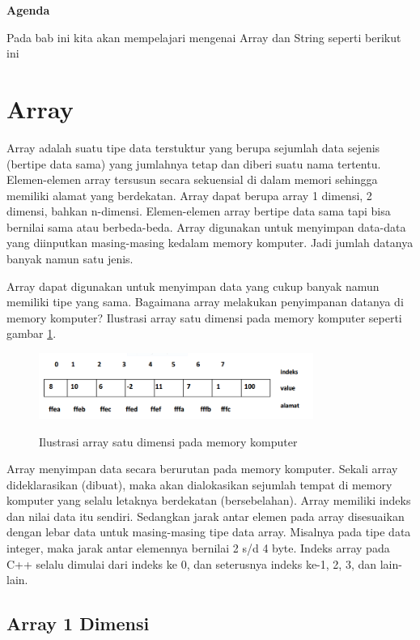 \textbf{Agenda}

Pada bab ini kita akan mempelajari mengenai Array dan String seperti berikut ini

\minitoc

\section{ Array}\label{array}

Array adalah suatu tipe data terstuktur yang berupa sejumlah data
sejenis (bertipe data sama) yang jumlahnya tetap dan diberi suatu nama
tertentu. Elemen-elemen array tersusun secara sekuensial di dalam memori
sehingga memiliki alamat yang berdekatan. Array dapat berupa array 1
dimensi, 2 dimensi, bahkan n-dimensi. Elemen-elemen array bertipe data
sama tapi bisa bernilai sama atau berbeda-beda. Array digunakan untuk
menyimpan data-data yang diinputkan masing-masing kedalam memory
komputer. Jadi jumlah datanya banyak namun satu jenis.

Array dapat digunakan untuk menyimpan data yang cukup banyak namun
memiliki tipe yang sama. Bagaimana array melakukan penyimpanan datanya
di memory komputer? Ilustrasi array satu dimensi pada memory komputer 
seperti gambar \ref{gambar3-1}.

\begin{figure}[htbp]
\centering
\includegraphics[width=0.8\textwidth]{../manuscript/images/capture3-1.PNG}
\label{gambar3-1}
\caption{Ilustrasi array satu dimensi pada memory komputer}
\end{figure}

Array menyimpan data secara berurutan pada memory komputer. Sekali array
dideklarasikan (dibuat), maka akan dialokasikan sejumlah tempat di
memory komputer yang selalu letaknya berdekatan (bersebelahan). Array
memiliki indeks dan nilai data itu sendiri. Sedangkan jarak antar elemen
pada array disesuaikan dengan lebar data untuk masing-masing tipe data
array. Misalnya pada tipe data integer, maka jarak antar elemennya
bernilai 2 s/d 4 byte. Indeks array pada C++ selalu dimulai dari indeks
ke 0, dan seterusnya indeks ke-1, 2, 3, dan lain-lain.

\subsection{Array 1 Dimensi}\label{array-1-dimensi}


